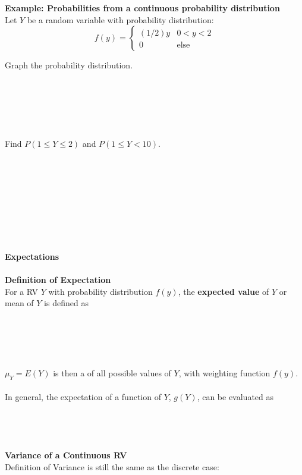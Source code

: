 \pagebreak

\textbf{Example: Probabilities from a continuous probability distribution}\\
Let $Y$ be a random variable with probability distribution:
\[ 
f(y) = \begin{cases} (1/2)y & 0<y<2 \\ 0 &\text{else}\end{cases}
\]
\be
\item Graph the probability distribution.\\~\\~\\~\\~\\~\\
\item Find $P(1\leq Y\leq 2)$ and $P(1\leq Y < 10)$.\\~\\~\\~\\~\\~\\~\\~\\~\\
\ee

\huge \textbf{Expectations} \normalsize\\~\\
\textbf{Definition of Expectation}\\
For a RV $Y$ with probability distribution $f(y)$, the \textbf{expected value} of $Y$ or mean of $Y$ is defined as\\~\\~\\~\\~\\~\\

$\mu_Y=E(Y)$ is then a \underbar{~~~~~~~~~~~~~~~~~~~~~~~~~~~~~~~~~~~~~~~~~~~~~~~~~~~~~~~}  of all possible values of $Y$, with weighting function $f(y)$.\\~\\
In general, the expectation of a {function} of $Y$, $g(Y)$, can be evaluated as\\~\\~\\~\\~\\

\textbf{Variance of a Continuous RV}\\
Definition of Variance is still the same as the discrete case:\\~\\~\\~\\~\\~\\


